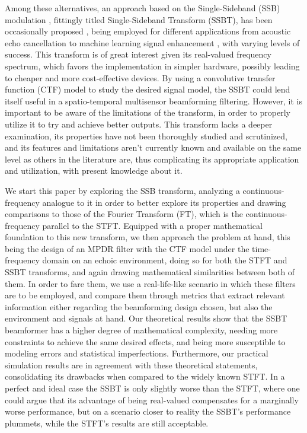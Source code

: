 Among these alternatives, an approach based on the Single-Sideband (SSB) modulation \cite{chen_hybrid_2021,xing_single_2017}, fittingly titled Single-Sideband Transform (SSBT), has been occasionally proposed \cite{crochiere_multirate_1983,oyzerman_system_2012}, being employed for different applications from acoustic echo cancellation \cite{chin_subband_2001} to machine learning signal enhancement \cite{okamoto_subband_2017}, with varying levels of success. This transform is of great interest given its real-valued frequency spectrum, which favors the implementation in simpler hardware, possibly leading to cheaper and more cost-effective devices. By using a convolutive transfer function (CTF) model \cite{talmon_relative_2009} to study the desired signal model, the SSBT could lend itself useful in a spatio-temporal multisensor beamforming filtering. However, it is important to be aware of the limitations of the transform, in order to properly utilize it to try and achieve better outputs. This transform lacks a deeper examination, its properties have not been thoroughly studied and scrutinized, and its features and limitations aren't currently known and available on the same level as others in the literature are, thus complicating its appropriate application and utilization, with present knowledge about it.

We start this paper by exploring the SSB transform, analyzing a continuous-frequency analogue to it in order to better explore its properties and drawing comparisons to those of the Fourier Transform (FT), which is the continuous-frequency parallel to the STFT. Equipped with a proper mathematical foundation to this new transform, we then approach the problem at hand, this being the design of an MPDR filter with the CTF model under the time-frequency domain on an echoic environment, doing so for both the STFT and SSBT transforms, and again drawing mathematical similarities between both of them. In order to fare them, we use a real-life-like scenario in which these filters are to be employed, and compare them through metrics that extract relevant information either regarding the beamforming design chosen, but also the environment and signals at hand. Our theoretical results show that the SSBT beamformer has a higher degree of mathematical complexity, needing more constraints to achieve the same desired effects, and being more susceptible to modeling errors and statistical imperfections. Furthermore, our practical simulation results are in agreement with these theoretical statements, consolidating its drawbacks when compared to the widely known STFT. In a perfect and ideal case the SSBT is only slightly worse than the STFT, where one could argue that its advantage of being real-valued compensates for a marginally worse performance, but on a scenario closer to reality the SSBT's performance plummets, while the STFT's results are still acceptable.

